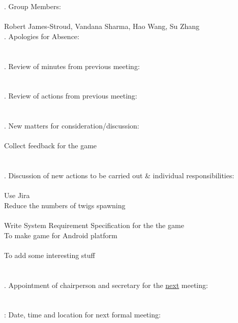 \documentclass{article}
\begin{document}
. Group Members: \\\\ \indent Robert James-Stroud, Vandana Sharma, Hao Wang, Su Zhang \\

. Apologies for Absence: \\\\ \indent   \\

. Review of minutes from previous meeting: \\\\ \indent  \\

. Review of actions from previous meeting: \\\\ \indent \\

. New matters for consideration/discussion: 
\\\\ \indent Collect feedback for the game \\\\\\

. Discussion of new actions to be carried out \& individual responsibilities: \\\\ \indent Use Jira \\  \indent Reduce the numbers of twigs spawning\\\\ \indent Write System Requirement Specification for the the game \\ \indent To make game for Android platform \\\\ \indent To add some interesting stuff \\\\\\

. Appointment of chairperson and secretary for the \underline{next} meeting: \\\\ \indent  \\

: Date, time and location for next formal meeting: \\\\ \indent  \\
\end{document}
